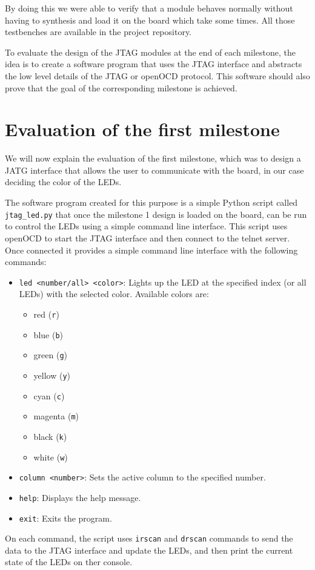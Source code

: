 \documentclass[a4paper,11pt,oneside]{report}
\begin{document}
By doing this we were able to verify that a module behaves normally without having to synthesis and load it on the board which take some times.
All those testbenches are available in the project repository. 

To evaluate the design of the JTAG modules at the end of each milestone, the idea is to create a software program that uses the JTAG interface and abstracts the low level details of the JTAG or openOCD protocol.
This software should also prove that the goal of the corresponding milestone is achieved.


\section{Evaluation of the first milestone}

We will now explain the evaluation of the first milestone, which was to design a JATG interface that allows the user to communicate with the board, in our case deciding the color of the LEDs.

The software program created for this purpose is a simple Python script called \texttt{jtag_led.py} that once the milestone 1 design is loaded on the board, can be run to control the LEDs using a simple command line interface.
This script uses openOCD to start the JTAG interface and then connect to the telnet server. Once connected it provides a simple command line interface with the following commands:
\begin{itemize}
    \item \texttt{led <number/all> <color>}: Lights up the LED at the specified index (or all LEDs) with the selected color. Available colors are:
    \begin{itemize}
        \item red (\texttt{r})
        \item blue (\texttt{b})
        \item green (\texttt{g})
        \item yellow (\texttt{y})
        \item cyan (\texttt{c})
        \item magenta (\texttt{m})
        \item black (\texttt{k})
        \item white (\texttt{w})
    \end{itemize}
    \item \texttt{column <number>}: Sets the active column to the specified number.
    \item \texttt{help}: Displays the help message.
    \item \texttt{exit}: Exits the program.
\end{itemize}
On each command, the script uses \texttt{irscan} and \texttt{drscan} commands to send the data to the JTAG interface and update the LEDs, and then print the current state of the LEDs on ther console.
\end{document}
